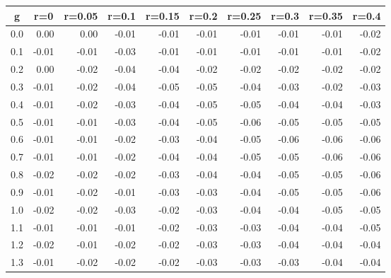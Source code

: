 %
\begin{table}[!tbp]
 \begin{center}
 \begin{tabular}{rrrrrrrrrr}\hline\hline
\multicolumn{1}{c}{g}&\multicolumn{1}{c}{r=0}&\multicolumn{1}{c}{r=0.05}&\multicolumn{1}{c}{r=0.1}&\multicolumn{1}{c}{r=0.15}&\multicolumn{1}{c}{r=0.2}&\multicolumn{1}{c}{r=0.25}&\multicolumn{1}{c}{r=0.3}&\multicolumn{1}{c}{r=0.35}&\multicolumn{1}{c}{r=0.4}\tabularnewline
\hline
0.0& 0.00& 0.00&-0.01&-0.01&-0.01&-0.01&-0.01&-0.01&-0.02\tabularnewline
0.1&-0.01&-0.01&-0.03&-0.01&-0.01&-0.01&-0.01&-0.01&-0.02\tabularnewline
0.2& 0.00&-0.02&-0.04&-0.04&-0.02&-0.02&-0.02&-0.02&-0.02\tabularnewline
0.3&-0.01&-0.02&-0.04&-0.05&-0.05&-0.04&-0.03&-0.02&-0.03\tabularnewline
0.4&-0.01&-0.02&-0.03&-0.04&-0.05&-0.05&-0.04&-0.04&-0.03\tabularnewline
0.5&-0.01&-0.01&-0.03&-0.04&-0.05&-0.06&-0.05&-0.05&-0.05\tabularnewline
0.6&-0.01&-0.01&-0.02&-0.03&-0.04&-0.05&-0.06&-0.06&-0.06\tabularnewline
0.7&-0.01&-0.01&-0.02&-0.04&-0.04&-0.05&-0.05&-0.06&-0.06\tabularnewline
0.8&-0.02&-0.02&-0.02&-0.03&-0.04&-0.04&-0.05&-0.05&-0.06\tabularnewline
0.9&-0.01&-0.02&-0.01&-0.03&-0.03&-0.04&-0.05&-0.05&-0.06\tabularnewline
1.0&-0.02&-0.02&-0.03&-0.02&-0.03&-0.04&-0.04&-0.05&-0.05\tabularnewline
1.1&-0.01&-0.01&-0.01&-0.02&-0.03&-0.03&-0.04&-0.04&-0.05\tabularnewline
1.2&-0.02&-0.01&-0.02&-0.02&-0.03&-0.03&-0.04&-0.04&-0.04\tabularnewline
1.3&-0.01&-0.02&-0.02&-0.02&-0.03&-0.03&-0.03&-0.04&-0.04\tabularnewline
\hline
\end{tabular}

\end{center}

\end{table}


